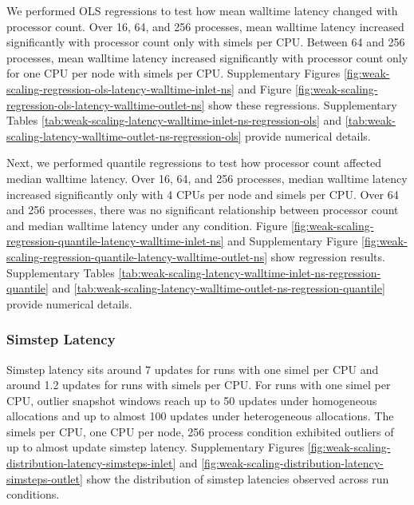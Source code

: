 We performed OLS regressions to test how mean walltime latency changed with processor count.
Over 16, 64, and 256 processes, mean walltime latency increased significantly with processor count only with  simels per CPU.
Between 64 and 256 processes, mean walltime latency increased significantly with processor count only for one CPU per node with  simels per CPU.
Supplementary Figures \ref{fig:weak-scaling-regression-ols-latency-walltime-inlet-ns} and Figure \ref{fig:weak-scaling-regression-ols-latency-walltime-outlet-ns} show these regressions.
Supplementary Tables \ref{tab:weak-scaling-latency-walltime-inlet-ns-regression-ols} and \ref{tab:weak-scaling-latency-walltime-outlet-ns-regression-ols} provide numerical details.



Next, we performed quantile regressions to test how processor count affected median walltime latency.
Over 16, 64, and 256 processes, median walltime latency increased significantly only with 4 CPUs per node and  simels per CPU.
Over 64 and 256 processes, there was no significant relationship between processor count and median walltime latency under any condition.
Figure \ref{fig:weak-scaling-regression-quantile-latency-walltime-inlet-ns} and Supplementary Figure \ref{fig:weak-scaling-regression-quantile-latency-walltime-outlet-ns} show regression results.
Supplementary Tables \ref{tab:weak-scaling-latency-walltime-inlet-ns-regression-quantile} and \ref{tab:weak-scaling-latency-walltime-outlet-ns-regression-quantile} provide numerical details.

\subsubsection{Simstep Latency}

Simstep latency sits around 7 updates for runs with one simel per CPU and around 1.2 updates for runs with  simels per CPU.
For runs with one simel per CPU, outlier snapshot windows reach up to 50 updates under homogeneous allocations and up to almost 100 updates under heterogeneous allocations.
The  simels per CPU, one CPU per node, 256 process condition exhibited outliers of up to almost  update simstep latency.
Supplementary Figures \ref{fig:weak-scaling-distribution-latency-simsteps-inlet} and \ref{fig:weak-scaling-distribution-latency-simsteps-outlet} show the distribution of simstep latencies observed across run conditions.

